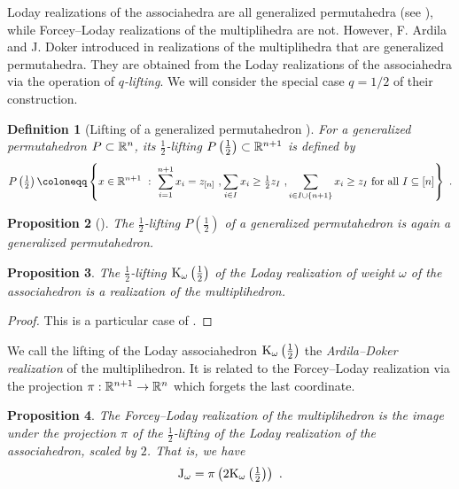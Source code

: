 \documentclass[twoside, 12pt]{amsart}
\newtheorem{definition}{Definition}[section]
\newtheorem{proposition}[definition]{Proposition}
\theoremstyle{remark}
\begin{document}
Loday realizations of the associahedra are all generalized permutahedra (see \cite[Corollary 8.2]{Postnikov09}), while Forcey--Loday realizations of the multiplihedra are not. 
However, F. Ardila and J. Doker introduced in \cite{AD13} realizations of the multiplihedra that are generalized permutahedra. 
They are obtained from the Loday realizations of the associahedra via the operation of \emph{$q$-lifting}. 
We will consider the special case $q=1/2$ of their construction.

\begin{definition}[Lifting of a generalized permutahedron {\cite[Definition 2.3]{AD13}}]
For a generalized permutahedron $P\subset \mathbb{R}^n$, its \emph{$\tfrac{1}{2}$-lifting} $P \left(\tfrac{1}{2}\right) \subset \mathbb{R}^{n+1}$ is defined by 
\[P \left(\tfrac{1}{2}\right) \coloneqq \left\{ x \in \RR^{n+1} \ : \ 
\sum_{i=1}^{n+1} x_i = z_{[n]} \ , 
\sum_{i \in I} x_i \geq \tfrac{1}{2}z_I \ ,
\sum_{i \in I \cup \{n+1\}} x_i \geq z_I 
\text{ for all } I \subseteq [n] \right\} \ . \]
\end{definition}

\begin{proposition}[{\cite[Proposition 2.4]{AD13}}] 
The $\tfrac{1}{2}$-lifting $P \left(\tfrac{1}{2}\right)$ of a generalized permutahedron is again a generalized permutahedron. 
\end{proposition}

\begin{proposition} 
The $\tfrac{1}{2}$-lifting $\mathrm{K}_\omega\left(\tfrac{1}{2}\right)$ of the Loday realization of weight $\omega$ of the associahedron is a realization of the multiplihedron. 
\end{proposition}
\begin{proof} 
This is a particular case of \cite[Corollary 4.10]{AD13}.
\end{proof}

We call the lifting of the Loday associahedron $\mathrm{K}_\omega\left(\tfrac{1}{2}\right)$ the\emph{ Ardila--Doker realization} of the multiplihedron. It is related to the Forcey--Loday realization via the projection $\pi: \mathbb{R}^{n+1} \to \mathbb{R}^n$ which forgets the last coordinate. 
 
\begin{proposition} 
\label{prop:lifting} 
The Forcey--Loday realization of the multiplihedron is the image under the projection $\pi$ of the $\tfrac{1}{2}$-lifting of the Loday realization of the associahedron, scaled by $2$. 
That is, we have  \[ \mathrm{J}_\omega = \pi \left(2 \mathrm{K}_\omega\left(\tfrac{1}{2}\right)\right) \ . \]
\end{proposition}
\end{document}
